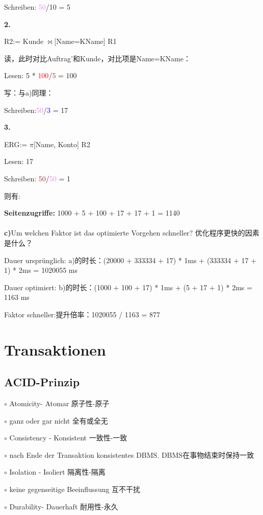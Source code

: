 \documentclass[fleqn]{article}
\begin{document}
Schreiben: \textcolor{violet}{50}/\textcolor[RGB]{84,139,84}{10} = 5

\textbf{2.}

R2:= Kunde $\bowtie$[Name=KName] R1

读，此时对比Auftrag'和Kunde，对比项是Name=KName：

Lesen: 5 * \textcolor{red}{100}/\textcolor{brown}{5} = 100

写：与a)同理：

Schreiben:\textcolor{violet}{50}/\textcolor{blue}{3} = 17

\textbf{3.}

ERG:= $\pi$[Name, Konto] R2

Lesen: 17

Schreiben: \textcolor{brown}{50}/\textcolor{violet}{50} = 1 

则有:

\textbf{Seitenzugriffe:} 1000 + 5 + 100 + 17 + 17 + 1 = 1140
\\
\\
\textbf{c)}Um welchen Faktor ist das optimierte Vorgehen schneller?
优化程序更快的因素是什么？

Dauer ursprünglich: a)的时长：(20000 + 333334 + 17) * 1ms + (333334 + 17 + 1) * 2ms = 1020055 ms

Dauer optimiert: b)的时长：(1000 + 100 + 17) * 1ms + (5 + 17 + 1) * 2ms = 1163 ms

Faktor schneller:提升倍率：1020055 / 1163 = 877

\section{Transaktionen}

\subsection{ACID-Prinzip}

\noindent$\circ$ Atomicity- Atomar 原子性-原子

$\circ$ ganz oder gar nicht 全有或全无

\noindent$\circ$ Consistency - Konsistent 一致性-一致

$\circ$ nach Ende der Transaktion konsistentes DBMS. DBMS在事物结束时保持一致

\noindent$\circ$ Isolation - Isoliert 隔离性-隔离

$\circ$ keine gegenseitige Beeinflussung 互不干扰

\noindent$\circ$ Durability- Dauerhaft 耐用性-永久
\end{document}
